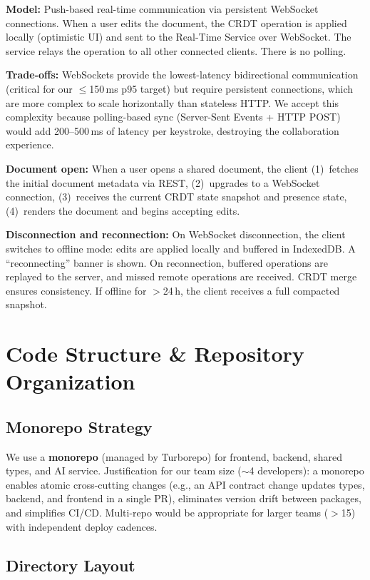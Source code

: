 \documentclass[10pt, a4paper]{article}
\begin{document}
\textbf{Model:} Push-based real-time communication via persistent WebSocket connections. When a user edits the document, the CRDT operation is applied locally (optimistic UI) and sent to the Real-Time Service over WebSocket. The service relays the operation to all other connected clients. There is no polling.

\textbf{Trade-offs:} WebSockets provide the lowest-latency bidirectional communication (critical for our $\le$150\,ms p95 target) but require persistent connections, which are more complex to scale horizontally than stateless HTTP. We accept this complexity because polling-based sync (Server-Sent Events + HTTP POST) would add 200--500\,ms of latency per keystroke, destroying the collaboration experience.

\textbf{Document open:} When a user opens a shared document, the client (1)~fetches the initial document metadata via REST, (2)~upgrades to a WebSocket connection, (3)~receives the current CRDT state snapshot and presence state, (4)~renders the document and begins accepting edits.

\textbf{Disconnection and reconnection:} On WebSocket disconnection, the client switches to offline mode: edits are applied locally and buffered in IndexedDB. A ``reconnecting'' banner is shown. On reconnection, buffered operations are replayed to the server, and missed remote operations are received. CRDT merge ensures consistency. If offline for $>$24\,h, the client receives a full compacted snapshot.


\section{Code Structure \& Repository Organization}

\subsection{Monorepo Strategy}
We use a \textbf{monorepo} (managed by Turborepo) for frontend, backend, shared types, and AI service. Justification for our team size ($\sim$4 developers): a monorepo enables atomic cross-cutting changes (e.g., an API contract change updates types, backend, and frontend in a single PR), eliminates version drift between packages, and simplifies CI/CD. Multi-repo would be appropriate for larger teams ($>$15) with independent deploy cadences.

\subsection{Directory Layout}
\end{document}
